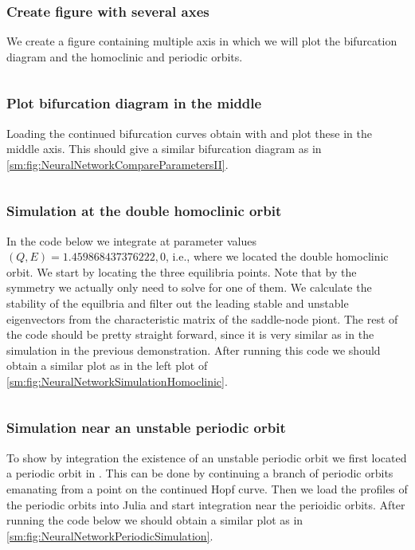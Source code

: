 \subsubsection{Create figure with several axes}
We create a figure containing multiple axis in which we will plot the bifurcation diagram and
the homoclinic and periodic orbits.
\inputminted[firstline=63, lastline=73]{julia}{\pathToJuliaFiles/neural_network_model_simulation_article.jl}

\subsubsection{Plot bifurcation diagram in the middle}
Loading the continued bifurcation curves obtain with \DDEBIFTOOL and plot these in the middle axis.
This should give a similar bifurcation diagram as in \cref{sm:fig:NeuralNetworkCompareParametersII}.
\inputminted[firstline=76, lastline=102]{julia}{\pathToJuliaFiles/neural_network_model_simulation_article.jl}

\subsubsection{Simulation at the double homoclinic orbit}
In the code below we integrate at parameter values $(Q,E)=1.459868437376222,0$, i.e.,
where we located the double homoclinic orbit. We start by locating the three equilibria
points. Note that by the symmetry we actually only need to solve for one of them.
We calculate the stability of the equilbria and filter out the leading stable and unstable
eigenvectors from the characteristic matrix of the saddle-node piont. 
The rest of the code should be pretty straight forward,
since it is very similar as in the simulation in the previous demonstration.
After running this code we should obtain a similar plot as in
the left plot of \cref{sm:fig:NeuralNetworkSimulationHomoclinic}.
\inputminted[firstline=105, lastline=166]{julia}{\pathToJuliaFiles/neural_network_model_simulation_article.jl}

\subsubsection{Simulation near an unstable periodic orbit}
To show by integration the existence of an unstable periodic orbit we first
located a periodic orbit in \DDEBIFTOOL. This can be done by continuing a
branch of periodic orbits emanating from a point on the continued Hopf curve.
Then we load the profiles of the periodic orbits into Julia and start
integration near the perioidic orbits.  After running the code below we should
obtain a similar plot as in
\cref{sm:fig:NeuralNetworkPeriodicSimulation}.
\inputminted[firstline=169, lastline=208]{julia}{\pathToJuliaFiles/neural_network_model_simulation_article.jl}




